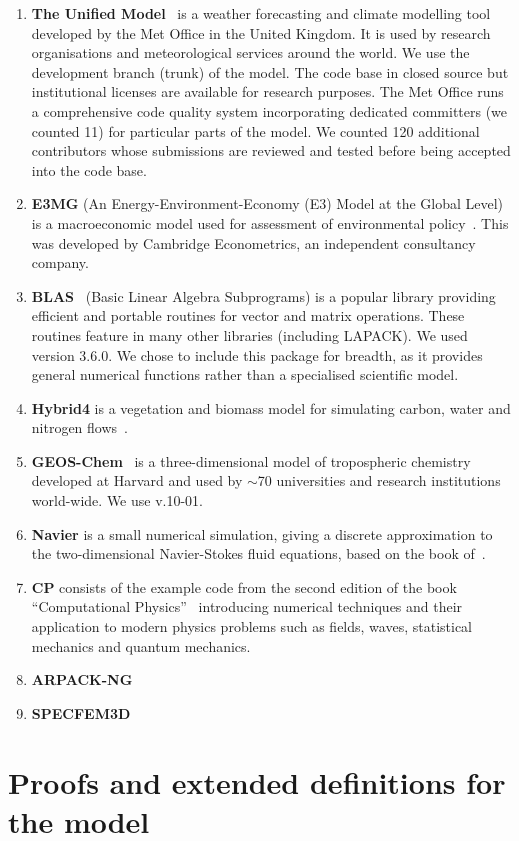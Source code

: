 \begin{enumerate}
\item \textbf{The Unified Model}~\cite{um} is a weather
  forecasting and climate modelling tool developed by the Met Office
  in the United Kingdom. It is used by research organisations and
  meteorological services around the world. We use the development
  branch (trunk) of the model. The code base in closed source but
  institutional licenses are available for research purposes. The Met
  Office runs a comprehensive code quality system incorporating
  dedicated committers (we counted 11) for particular parts of the
  model. We counted 120 additional contributors whose submissions are
  reviewed and tested before being accepted into the code base.

\item \textbf{E3MG} (An Energy-Environment-Economy (E3) Model at the Global
Level) is a macroeconomic model used for assessment of environmental
policy~\cite{RePEc:aen:journl:2006se-a12}. This was developed by
Cambridge Econometrics, an independent consultancy company.

\item \textbf{BLAS}~\cite{blas} (Basic Linear Algebra Subprograms) is
  a popular library providing efficient and portable routines for
  vector and matrix operations. These routines feature in many other
  libraries (including LAPACK). We used version 3.6.0. We chose to
  include this package for breadth, as it provides general numerical
  functions rather than a specialised scientific model.

\item \textbf{Hybrid4} is a vegetation and biomass model for
  simulating carbon, water and nitrogen flows~\cite{GBC:GBC635}.

\item \textbf{GEOS-Chem}~\cite{geos-chem} is a three-dimensional model
  of tropospheric chemistry developed at Harvard and used by $\sim$70
  universities and research institutions world-wide. We use v.10-01.

\item \textbf{Navier} is a small numerical simulation, giving a
  discrete approximation to the two-dimensional Navier-Stokes fluid
  equations, based on the book of~\citet{griebel1997numerical}.

\item \textbf{CP} consists of the example code from the second edition
  of the book ``Computational
  Physics''~\cite{nicholas2006computational} introducing numerical
  techniques and their application to modern physics problems such as
  fields, waves, statistical mechanics and quantum mechanics.

\item \textbf{ARPACK-NG}~\cite{arpackng} 

\item \textbf{SPECFEM3D}~\cite{specfem3d} 
\end{enumerate}

\section{Proofs and extended definitions for the model}
\label{sec:proofs}


